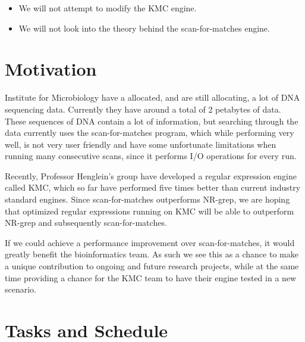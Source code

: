 \documentclass[12pt]{article}
\begin{document}
\begin{itemize}
	\item We will not attempt to modify the KMC engine.
	\item We will not look into the theory behind the scan-for-matches engine.
\end{itemize}

\newpage

\section{Motivation}

Institute for Microbiology have a allocated, and are still allocating, a lot of DNA sequencing data. Currently they have around a total of 2 petabytes of data. These sequences of DNA contain a lot of information, but searching through the data currently uses the scan-for-matches program, which while performing very well, is not very user friendly and have some unfortunate limitations when running many consecutive scans, since it performs I/O operations for every run.

Recently, Professor Henglein's group have developed a regular expression engine called KMC, which so far have performed five times better than current industry standard engines. Since scan-for-matches outperforms NR-grep\cite{nrgrep}, we are hoping that optimized regular expressions running on KMC will be able to outperform NR-grep and subsequently scan-for-matches.

If we could achieve a performance improvement over scan-for-matches, it would greatly benefit the bioinformatics team. As such we see this as a chance to make a unique contribution to ongoing and future research projects, while at the same time providing a chance for the KMC team to have their engine tested in a new scenario.

\newpage

\section{Tasks and Schedule}
\end{document}
